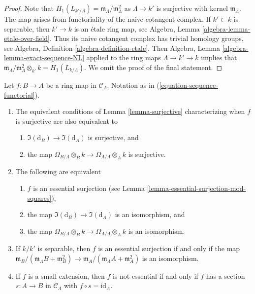 \begin{proof}
Note that $H_1(L_{k'/\Lambda}) = \mathfrak m_\Lambda/\mathfrak m_\Lambda^2$
as $\Lambda \to k'$ is surjective with kernel $\mathfrak m_\Lambda$.
The map arises from functoriality of the naive cotangent complex.
If $k' \subset k$ is separable, then $k' \to k$ is an \'etale ring map, see
Algebra, Lemma \ref{algebra-lemma-etale-over-field}.
Thus its naive cotangent complex has trivial homology groups, see
Algebra, Definition \ref{algebra-definition-etale}.
Then
Algebra, Lemma \ref{algebra-lemma-exact-sequence-NL}
applied to the ring maps $\Lambda \to k' \to k$ implies that
$\mathfrak m_\Lambda/\mathfrak m_\Lambda^2 \otimes_{k'} k = H_1(L_{k/\Lambda})$.
We omit the proof of the final statement.
\end{proof}

\begin{lemma}
\label{lemma-essential-surjection}
Let $f: B \to A$ be a ring map in $\mathcal{C}_\Lambda$.
Notation as in (\ref{equation-sequence-functorial}).
\begin{enumerate}
\item The equivalent conditions of
Lemma \ref{lemma-surjective}
characterizing when $f$ is surjective are also equivalent to
\begin{enumerate}
\item $\Im(\text{d}_B) \to \Im(\text{d}_A)$ is surjective, and
\item the map $\Omega_{B/\Lambda} \otimes_B k \to
\Omega_{A/\Lambda} \otimes_A k$ is surjective.
\end{enumerate}
\item The following are equivalent
\begin{enumerate}
\item $f$ is an essential surjection
(see Lemma \ref{lemma-essential-surjection-mod-squares}),
\item the map $\Im(\text{d}_B) \to \Im(\text{d}_A)$ is an
isomorphism, and
\item the map $\Omega_{B/\Lambda} \otimes_B k \to
\Omega_{A/\Lambda} \otimes_A k$ is an isomorphism.
\end{enumerate}
\item If $k/k'$ is separable, then $f$ is an essential surjection if
and only if the map
$\mathfrak m_B/(\mathfrak m_\Lambda B + \mathfrak m_B^2) \to
\mathfrak m_A/(\mathfrak m_\Lambda A + \mathfrak m_A^2)$
is an isomorphism.
\item If $f$ is a small extension, then $f$ is not essential if and only if
$f$ has a section $s: A \to B$ in $\mathcal{C}_\Lambda$
with $f \circ s = \text{id}_A$.
\end{enumerate}
\end{lemma}

